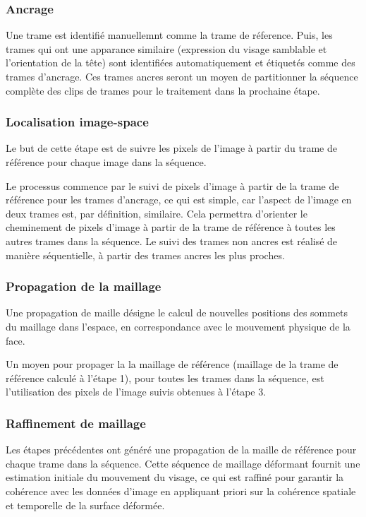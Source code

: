 \documentclass[a4paper,11pt]{article}
\begin{document}
\subsubsection*{Ancrage}
Une trame est identifié manuellemnt comme la trame de réference. Puis, les trames qui ont une apparance similaire (expression du visage samblable et l'orientation de la tête) sont identifiées automatiquement et étiquetés comme des trames d'ancrage. Ces trames ancres seront un moyen de partitionner la séquence complète des clips de trames pour le traitement dans la prochaine étape.

\subsubsection*{Localisation image-space}
Le but de cette étape est de suivre les pixels de l'image à partir du trame de référence pour chaque image dans la séquence. 

Le processus commence par le suivi de pixels d'image à partir de la trame de référence pour les trames d'ancrage, ce qui est simple, car l'aspect de l'image en deux trames est, par définition, similaire. Cela permettra d'orienter le cheminement de pixels d'image à partir de la trame de référence à toutes les autres trames dans la séquence. 
Le suivi des trames non ancres est réalisé de manière séquentielle, à partir des trames ancres les plus proches.

\subsubsection*{Propagation de la maillage}

Une propagation de maille désigne le calcul de nouvelles positions des sommets du maillage dans l'espace, en correspondance avec le mouvement physique de la face.

Un moyen pour propager la la maillage de référence (maillage de la trame de référence calculé à l'étape 1), pour toutes les trames dans la séquence, est l'utilisation des pixels de l'image suivis obtenues à l'étape 3.
 
\subsubsection*{Raffinement de maillage}

Les étapes précédentes ont généré une propagation de la maille de référence pour chaque trame dans la séquence. Cette séquence de maillage déformant fournit une estimation initiale du mouvement du visage, ce qui est raffiné pour garantir la cohérence avec les données d'image en appliquant priori sur la cohérence spatiale et temporelle de la surface déformée.
\end{document}
